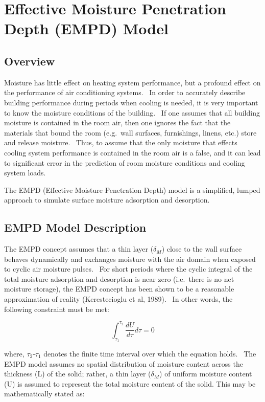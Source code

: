 \section{Effective Moisture Penetration Depth (EMPD) Model}\label{effective-moisture-penetration-depth-empd-model}

\subsection{Overview}\label{overview-014}

Moisture has little effect on heating system performance, but a profound effect on the performance of air conditioning systems.~ In order to accurately describe building performance during periods when cooling is needed, it is very important to know the moisture conditions of the building.~ If one assumes that all building moisture is contained in the room air, then one ignores the fact that the materials that bound the room (e.g.~wall surfaces, furnishings, linens, etc.) store and release moisture.~ Thus, to assume that the only moisture that effects cooling system performance is contained in the room air is a false, and it can lead to significant error in the prediction of room moisture conditions and cooling system loads.

The EMPD (Effective Moisture Penetration Depth) model is a simplified, lumped approach to simulate surface moisture adsorption and desorption.

\subsection{EMPD Model Description}\label{empd-model-description}

The EMPD concept assumes that a thin layer ($\delta$\(_{M}\)) close to the wall surface behaves dynamically and exchanges moisture with the air domain when exposed to cyclic air moisture pulses.~ For short periods where the cyclic integral of the total moisture adsorption and desorption is near zero (i.e.~there is no net moisture storage), the EMPD concept has been shown to be a reasonable approximation of reality (Kerestecioglu et al, 1989).~ In other words, the following constraint must be met:

\begin{equation}
\int_{{\tau_1}}^{{\tau_2}} {\frac{{dU}}{{d\tau }}} d\tau  = 0
\end{equation}

where, $\tau$\(_{2}\)-$\tau$\(_{1}\) denotes the finite time interval over which the equation holds.~ The EMPD model assumes no spatial distribution of moisture content across the thickness (L) of the solid; rather, a thin layer ($\delta$\(_{M}\)) of uniform moisture content (U) is assumed to represent the total moisture content of the solid. This may be mathematically stated as:

